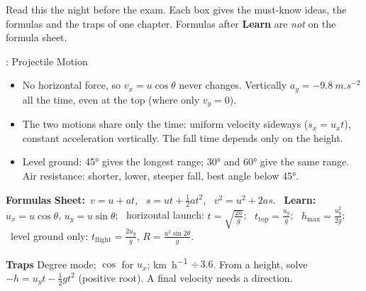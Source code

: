 
Read this the night before the exam. Each box gives the must-know ideas, the formulas and the
traps of one chapter. Formulas after \textcolor{hscmistake}{\bfseries Learn} are \emph{not} on
the formula sheet.

\newcommand\sumhead[1]{\par{\bfseries\color{hscbrand}#1}\enspace}
\newcommand\sumLearn{{\bfseries\color{hscmistake}Learn:}}
\newcommand\sumSheet{{\bfseries\color{hscformula}Sheet:}}

\begin{summarybox}[fontupper=\small, unbreakable]{: Projectile Motion}
\begin{itemize}[itemsep=0pt, topsep=0pt]
  \item No horizontal force, so $v_x = u\cos\theta$ never changes. Vertically
        $a_y = \qty{-9.8}{m.s^{-2}}$ all the time, even at the top (where only $v_y = 0$).
  \item The two motions share only the time: uniform velocity sideways ($s_x = u_x t$),
        constant acceleration vertically. The fall time depends only on the height.
  \item Level ground: \ang{45} gives the longest range; \ang{30} and \ang{60} give the same
        range. Air resistance: shorter, lower, steeper fall, best angle below \ang{45}.
\end{itemize}
\sumhead{Formulas} \sumSheet\ $v = u + at$, \ $s = ut + \frac{1}{2}at^2$, \ $v^2 = u^2 + 2as$.
\ \sumLearn\ $u_x = u\cos\theta$, $u_y = u\sin\theta$; \ horizontal launch:
$t = \sqrt{\frac{2h}{g}}$; \ $t_\mathrm{top} = \frac{u_y}{g}$; \
$h_\mathrm{max} = \frac{u_y^2}{2g}$; \ level ground only: $t_\mathrm{flight} = \frac{2u_y}{g}$,
$R = \frac{u^2\sin 2\theta}{g}$.
\sumhead{Traps} Degree mode; $\cos$ for $u_x$; \si{km.h^{-1}} $\div\,3.6$. From a height,
solve $-h = u_y t - \frac{1}{2}gt^2$ (positive root). A final velocity needs a direction.
\end{summarybox}

